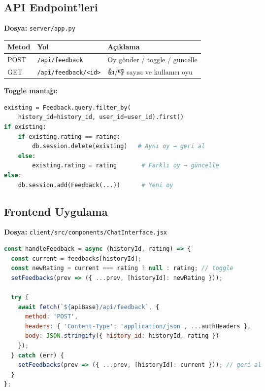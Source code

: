 \documentclass[12pt,a4paper]{article}
\begin{document}
\subsection{API Endpoint'leri}

\textbf{Dosya:} \texttt{server/app.py}

\begin{tabular}{lll}
\toprule
\textbf{Metod} & \textbf{Yol} & \textbf{Açıklama} \\
\midrule
POST & \texttt{/api/feedback} & Oy gönder / toggle / güncelle \\
GET  & \texttt{/api/feedback/<id>} & 👍/👎 sayısı ve kullanıcı oyu \\
\bottomrule
\end{tabular}

\textbf{Toggle mantığı:}

\begin{lstlisting}[language=Python, caption={POST /api/feedback - toggle ve güncelleme}]
existing = Feedback.query.filter_by(
    history_id=history_id, user_id=user_id).first()
if existing:
    if existing.rating == rating:
        db.session.delete(existing)   # Aynı oy → geri al
    else:
        existing.rating = rating       # Farklı oy → güncelle
else:
    db.session.add(Feedback(...))      # Yeni oy
\end{lstlisting}

\subsection{Frontend Uygulama}

\textbf{Dosya:} \texttt{client/src/components/ChatInterface.jsx}

\begin{lstlisting}[language=JavaScript, caption={Optimistic update ile feedback butonu}]
const handleFeedback = async (historyId, rating) => {
  const current = feedbacks[historyId];
  const newRating = current === rating ? null : rating; // toggle
  setFeedbacks(prev => ({ ...prev, [historyId]: newRating }));

  try {
    await fetch(`${apiBase}/api/feedback`, {
      method: 'POST',
      headers: { 'Content-Type': 'application/json', ...authHeaders },
      body: JSON.stringify({ history_id: historyId, rating })
    });
  } catch (err) {
    setFeedbacks(prev => ({ ...prev, [historyId]: current })); // geri al
  }
};
\end{lstlisting}

\newpage
\end{document}

